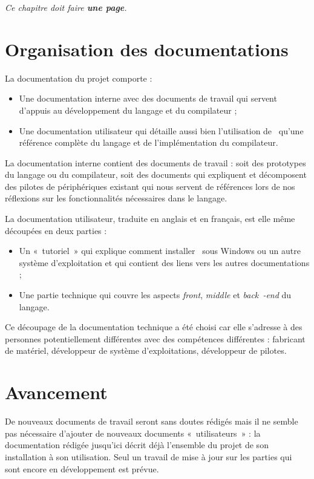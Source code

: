 \documentclass[francais]{rtxreport}
\begin{document}
\emph{Ce chapitre doit faire \textbf{une page}.}

\section{Organisation des documentations}

La documentation du projet comporte :
\begin{itemize}
\item Une documentation interne avec des documents de travail qui servent
  d'appuis au développement du langage et du compilateur ;
\item Une documentation utilisateur qui détaille aussi bien l'utilisation de
  \rtx\ qu'une référence complète du langage et de l'implémentation du
  compilateur.
\end{itemize}

La documentation interne contient des documents de travail : soit des prototypes
du langage ou du compilateur, soit des documents qui expliquent et décomposent
des pilotes de périphériques existant qui nous servent de références lors de nos
réflexions sur les fonctionnalités nécessaires dans le langage.

La documentation utilisateur, traduite en anglais et en français, est elle même
découpées en deux parties :
\begin{itemize}
\item Un «~tutoriel~» qui explique comment installer \rtx\ sous Windows ou un
  autre système d'exploitation et qui contient des liens vers les autres
  documentations ;
\item Une partie technique qui couvre les aspects \emph{front}, \emph{middle} et
  \emph{back~-end} du langage.
\end{itemize}
Ce découpage de la documentation technique a été choisi car elle s'adresse à des
personnes potentiellement différentes avec des compétences différentes :
fabricant de matériel, développeur de système d'exploitations, développeur de
pilotes.

\section{Avancement}

De nouveaux documents de travail seront sans doutes rédigés mais il ne semble
pas nécessaire d'ajouter de nouveaux documents «~utilisateurs~» : la
documentation rédigée jusqu'ici décrit déjà l'ensemble du projet de son
installation à son utilisation. Seul un travail de mise à jour sur les parties
qui sont encore en développement est prévue.
\end{document}
